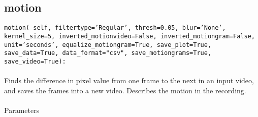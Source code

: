 \documentclass[9pt]{extarticle}
\def\code#1{\texttt{#1}}
\begin{document}
\subsection{motion}

\code{motion(
    self, 
    filtertype='Regular', 
    thresh=0.05, 
    blur='None',
    kernel\_size=5, 
    inverted\_motionvideo=False, 
    inverted\_motiongram=False,
    unit='seconds', 
    equalize\_motiongram=True, 
    save\_plot=True, 
    save\_data=True, 
    data\_format="csv", 
    save\_motiongrams=True, 
    save\_video=True):}
\\\\
Finds the difference in pixel value from one frame to the next in an 
input video, and saves the frames into a new video. Describes the 
motion in the recording.
\\\\

\noindent Parameters
\end{document}
